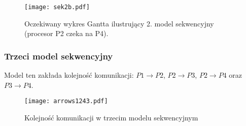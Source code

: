 \begin{figure}[H]
\centering
\texttt{[image: sek2b.pdf]}
\caption{Oczekiwany wykres Gantta ilustrujący 2. model sekwencyjny (procesor P2 czeka na P4).}
\label{fig:seq2b}
\end{figure}

\subsubsection{Trzeci model sekwencyjny}

Model ten zakłada kolejność komunikacji: $P1 \to P2$, $P2 \to P3$, $P2 \to P4$ oraz $P3 \to P4$. \\

\begin{figure}[!ht]
\centering
\texttt{[image: arrows1243.pdf]}
\caption{Kolejność komunikacji w trzecim modelu sekwencyjnym}
\label{fig:seq3}
\end{figure}

